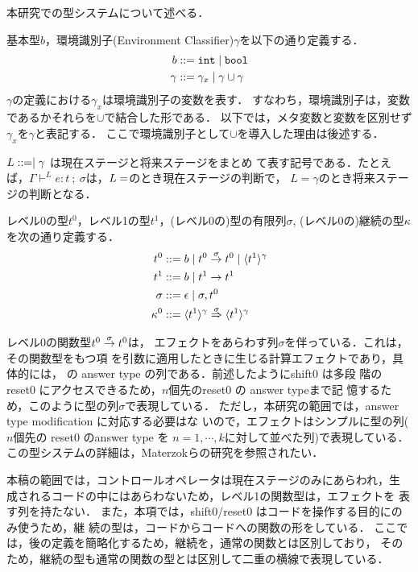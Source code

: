 本研究での型システムについて述べる．

基本型$b$，環境識別子(Environment Classifier)$\gamma$を以下の通り定義する．
\begin{align*}
  b & ::= \mbox{\texttt{int}} \mid \mbox{\texttt{bool}} \\
  \gamma & ::= \gamma_x \mid \gamma \cup \gamma
\end{align*}
$\gamma$の定義における$\gamma_x$は環境識別子の変数を表す．
すなわち，環境識別子は，変数であるかそれらを$\cup$で結合した形である．
以下では，メタ変数と変数を区別せず$\gamma_x$を$\gamma$と表記する．
ここで環境識別子として$\cup$を導入した理由は後述する．

$L ::= \empty \mid \gamma$ は現在ステージと将来ステージをまとめ
て表す記号である．たとえば，$\Gamma \vdash^L
e:t~;~\sigma$は，$L=\empty$のとき現在ステージの判断で，
$L=\gamma$のとき将来ステージの判断となる．

レベル0の型$t^0$，レベル1の型$t^1$，(レベル0の)型の有限列$\sigma$,
(レベル0の)継続の型$\kappa$を次の通り定義する．
\begin{align*}
  t^0 & ::= b \mid {t^0} \stackrel{\sigma}{\rightarrow} {t^0} \mid \langle{t^1}\rangle^{\gamma} \\
  t^1 & ::= b \mid t^1 \to t^1 \\
  \sigma & ::= \epsilon \mid \sigma,t^0 \\
  \kappa^0 & ::= {\langle{t^1}\rangle^{\gamma}} \stackrel{\sigma}{\Rightarrow} {\langle{t^1}\rangle^{\gamma}}
\end{align*}

レベル0の関数型${t^0} \stackrel{\sigma}{\rightarrow} {t^0}$は，
エフェクトをあらわす列$\sigma$を伴っている．これは，その関数型をもつ項
を引数に適用したときに生じる計算エフェクトであり，具体的には，
\Shiftz の answer type の列である．前述したようにshift0 は多段
階の reset0 にアクセスできるため，$n$個先のreset0 の answer typeまで記
憶するため，このように型の列$\sigma$で表現している．
ただし，本研究の範囲では，answer type modification に対応する必要はな
いので，エフェクトはシンプルに型の列($n$個先の reset0 のanswer type を
$n=1,\cdots,k$に対して並べた列)で表現している．
この型システムの詳細は，Materzokら\cite{Materzok2011}の研究を参照されたい．

本稿の範囲では，コントロールオペレータは現在ステージのみにあらわれ，生
成されるコードの中にはあらわないため，レベル1の関数型は，エフェクトを
表す列を持たない．
また，本項では，shift0/reset0 はコードを操作する目的にのみ使うため，継
続の型は，コードからコードへの関数の形をしている．
ここでは，後の定義を簡略化するため，継続を，通常の関数とは区別しており，
そのため，継続の型も通常の関数の型とは区別して二重の横線で表現している．

